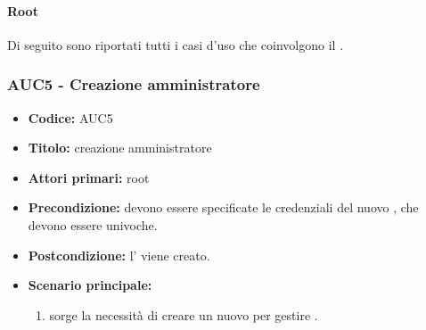 \documentclass[casi-duso]{subfiles}
\begin{document}
\paragraph{Root}
Di seguito sono riportati tutti i casi d'uso che coinvolgono il  .

\subsubsection{AUC5 - Creazione amministratore}%
\label{subsub:AUC5}
\begin{itemize}
  \item \textbf{Codice:} AUC5
  \item \textbf{Titolo:} creazione amministratore
  \item \textbf{Attori primari:} root
  \item \textbf{Precondizione:} devono essere specificate le credenziali del nuovo , che devono essere univoche.
  \item \textbf{Postcondizione:} l' viene creato.
  \item \textbf{Scenario principale:}
  \begin{enumerate}
    \item sorge la necessità di creare un nuovo  per gestire .
  \end{enumerate}
\end{itemize}
\end{document}
